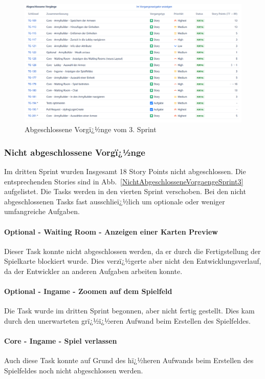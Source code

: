\documentclass[12pt, titlepage]{scrartcl}
\newcommand{\Abb}[1]{%
	Abb.\ \ref{#1}%
}
\begin{document}
		\begin{figure}[H] 
			\centering
			\includegraphics[width=1\textwidth]{Abschlossene_Vorgaenge_Sprint_3.png}
			\caption{Abgeschlossene Vorgï¿½nge vom 3. Sprint}
			\label{AbgeschlosseneVorgaengeSprint3}
		\end{figure}
	
		\subsubsection{Nicht abgeschlossene Vorgï¿½nge}
		Im dritten Sprint wurden Insgesamt 18 Story Points nicht abgeschlossen. Die entsprechenden Stories sind in \Abb{NichtAbgeschlosseneVorgaengeSprint3} aufgelistet. Die Tasks werden in den vierten Sprint verschoben. Bei den nicht abgeschlossenen Tasks fast ausschlieï¿½lich um optionale oder weniger umfangreiche Aufgaben.
			
			\paragraph{Optional - Waiting Room - Anzeigen einer Karten Preview}
			Dieser Task konnte nicht abgeschlossen werden, da er durch die Fertigstellung der Spielkarte blockiert wurde. Dies verzï¿½gerte aber nicht den Entwicklungsverlauf, da der Entwickler an anderen Aufgaben arbeiten konnte. 
			
			\paragraph{Optional - Ingame - Zoomen auf dem Spielfeld}
			Die Task wurde im dritten Sprint begonnen, aber nicht fertig gestellt. Dies kam durch den unerwarteten grï¿½ï¿½eren Aufwand beim Erstellen des Spielfeldes.
			
			\paragraph{Core - Ingame - Spiel verlassen}
			Auch diese Task konnte auf Grund des hï¿½heren Aufwands beim Erstellen des Spielfeldes noch nicht abgeschlossen werden. 
			
\end{document}
